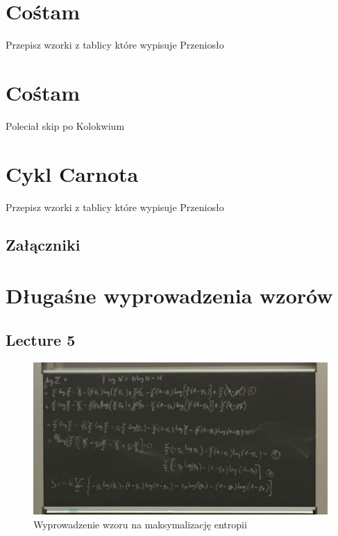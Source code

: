 \documentclass[12pt,a4paper]{report}
\newcommand{\com}[1]{{\color{red} #1}}
\newenvironment{lecture}[1]{\par\medskip
   \noindent\chapter{#1} \rmfamily}{\medskip}
\begin{document}
\begin{lecture}{Cośtam}
\com{Przepisz wzorki z tablicy które wypisuje Przeniosło}
\end{lecture}


\begin{lecture}{Cośtam}
\com{Poleciał skip po Kolokwium}
\end{lecture}


\begin{lecture}{Cykl Carnota}
\com{Przepisz wzorki z tablicy które wypisuje Przeniosło}
\end{lecture}

\tableofcontents

\listoffigures

\printindex


\begin{center}
    \chapter*{Załączniki}
\end{center}

\appendix
\setcounter{table}{0}
\captionsetup[table]{name=Załącznik}
\captionsetup[figure]{name=Załącznik}
\captionsetup[section]{name=Lecture}

\chapter{Długaśne wyprowadzenia wzorów}

\section{Lecture 5}

\begin{figure}[!ht]
    \centering
    \includegraphics[width=\linewidth]{Wyk_5_Rys_2.JPG}
    \caption{Wyprowadzenie wzoru na maksymalizację entropii}
    \label{fig:lec_5:app:maksymalizacja_entropii}
\end{figure}
\end{document}
